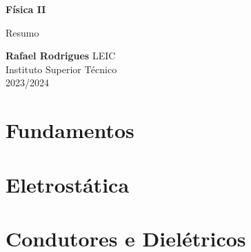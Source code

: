\documentclass[11pt]{article}
\begin{document}
\begin{titlepage}
    \begin{center}
        \vspace*{1cm}

        \textbf{\LARGE Física II}
        \vspace{0.5cm}

        \Large Resumo
        \vspace{1.5cm}

        \textbf{Rafael Rodrigues}
        \vfill
        LEIC \\
        Instituto Superior Técnico \\
        2023/2024
    \end{center}
\end{titlepage}

\tableofcontents

\newpage

\section{Fundamentos}

\section{Eletrostática}

\section{Condutores e Dielétricos}
\end{document}
